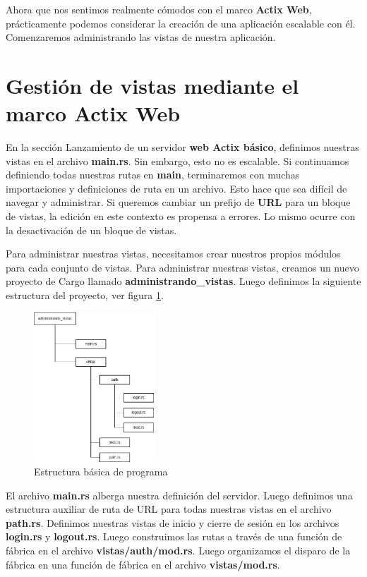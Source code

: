 Ahora que nos sentimos realmente cómodos con el marco \textbf{Actix Web}, prácticamente podemos considerar la creación de una aplicación escalable con él. Comenzaremos administrando las vistas de nuestra aplicación.

\section{Gestión de vistas mediante el marco Actix Web}

En la sección Lanzamiento de un servidor \textbf{web Actix básico}, definimos nuestras vistas en el archivo \textbf{main.rs}. Sin embargo, esto no es escalable. Si continuamos definiendo todas nuestras rutas en \textbf{main}, terminaremos con muchas importaciones y definiciones de ruta en un archivo. Esto hace que sea difícil de navegar y administrar. Si queremos cambiar un prefijo de \textbf{URL} para un bloque de vistas, la edición en este contexto es propensa a errores. Lo mismo ocurre con la desactivación de un bloque de vistas.

Para administrar nuestras vistas, necesitamos crear nuestros propios módulos para cada conjunto de vistas. Para administrar nuestras vistas, creamos un nuevo proyecto de Cargo llamado \textbf{administrando\_vistas}. Luego definimos la siguiente estructura del proyecto, ver figura \ref{cap2:001}.

\begin{figure}[htb]
	\centering
	\includegraphics[width=0.4\textwidth]{capitulo2/estructura.png}
	\caption{Estructura básica de programa}
	\label{cap2:001}
\end{figure}

El archivo \textbf{main.rs} alberga nuestra definición del servidor. Luego definimos una estructura auxiliar de ruta de URL para todas nuestras vistas en el archivo \textbf{path.rs}. Definimos nuestras vistas de inicio y cierre de sesión en los archivos \textbf{login.rs} y \textbf{logout.rs}. Luego construimos las rutas a través de una función de fábrica en el archivo \textbf{vistas/auth/mod.rs}. Luego organizamos el disparo de la fábrica en una función de fábrica en el archivo \textbf{vistas/mod.rs}.

